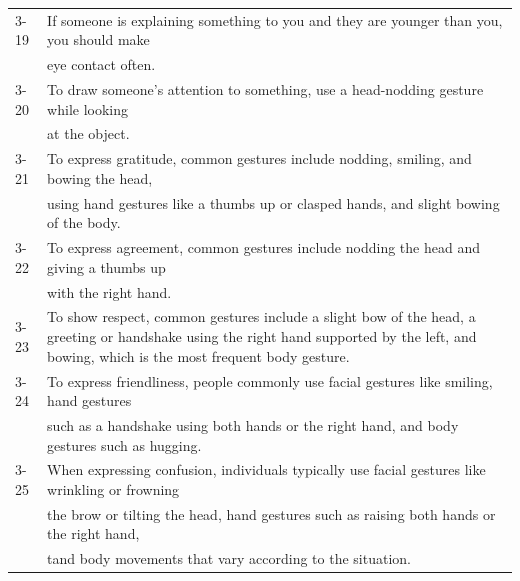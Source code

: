 \documentclass{CSSRforAfrica}
\begin{document}
\begin{table}[H]
\begin{center}
\begin{tabularx}{\linewidth}{|l |X|}
\vspace{-0.2mm} {\small 3-19 }  & {\small If someone is explaining something to you and they are younger than you, you should make }\\ 
\vspace{-0.2mm} {\small  }  & {\small eye contact  often.} \\

\vspace{-0.2mm} {\small 3-20 }  & {\small To draw someone's attention to something, use a head-nodding gesture while looking }\\
\vspace{-0.2mm} {\small  }  & {\small  at the object.}\\

\vspace{-0.2mm} {\small 3-21 }  & {\small To express gratitude, common gestures include nodding, smiling, and bowing the head, }\\
\vspace{-0.2mm} {\small  }  & {\small   using hand gestures like a thumbs up or clasped hands, and slight bowing of the body.}\\

\vspace{-0.2mm} {\small 3-22 }  & {\small To express agreement, common gestures include nodding the head and giving a thumbs up }\\
\vspace{-0.2mm} {\small  }  & {\small  with the right hand.}\\

\vspace{-0.2mm} {\small 3-23 }  & {\small To show respect, common gestures include a slight bow of the head, a greeting or handshake using the right hand supported by the left, and bowing, which is the most frequent body gesture.}\\

\vspace{-0.2mm} {\small 3-24 } & {\small To express friendliness, people commonly use facial gestures like smiling, hand gestures }\\
\vspace{-0.2mm} {\small  } & {\small such as a handshake using both hands or the right hand, and body gestures such as hugging.}\\

\vspace{-0.2mm} {\small 3-25 }  & {\small When expressing confusion, individuals typically use facial gestures like wrinkling or frowning }\\
\vspace{-0.2mm} {\small }  & {\small the brow or tilting the head, hand gestures such as raising both hands or the right hand, }\\
\vspace{-0.2mm} {\small }  & {\small tand body movements that vary according to the situation.}\\


\end{tabularx}
\end{center}
\end{table}
\end{document}

